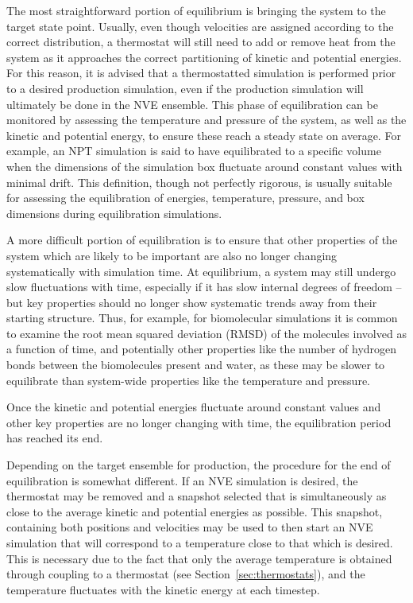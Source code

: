 \documentclass[9pt,bestpractices]{livecoms}
\begin{document}
The most straightforward portion of equilibrium is bringing the system to the target state point.
Usually, even though velocities are assigned according to the correct distribution, a thermostat will still need to add or remove heat from the system as it approaches the correct partitioning of kinetic and potential energies.
For this reason, it is advised that a thermostatted simulation is performed prior to a desired production simulation, even if the production simulation will ultimately be done in the NVE ensemble. 
This phase of equilibration can be monitored by assessing the temperature and pressure of the system, as well as the kinetic and potential energy, to ensure these reach a steady state on average.
For example, an NPT simulation is said to have equilibrated to a specific volume when the dimensions of the simulation box fluctuate around constant values with minimal drift. 
This definition, though not perfectly rigorous, is usually suitable for assessing the equilibration of energies, temperature, pressure, and box dimensions during equilibration simulations.

A more difficult portion of equilibration is to ensure that other properties of the system which are likely to be important are also no longer changing systematically with simulation time.
At equilibrium, a system may still undergo slow fluctuations with time, especially if it has slow internal degrees of freedom -- but key properties should no longer show systematic trends away from their starting structure.
Thus, for example, for biomolecular simulations it is common to examine the root mean squared deviation (RMSD) of the molecules involved as a function of time, and potentially other properties like the number of hydrogen bonds between the biomolecules present and water, as these may be slower to equilibrate than system-wide properties like the temperature and pressure.

Once the kinetic and potential energies fluctuate around constant values and other key properties are no longer changing with time, the equilibration period has reached its end.

Depending on the target ensemble for production, the procedure for the end of equilibration is somewhat different.
If an NVE simulation is desired, the thermostat may be removed and a snapshot selected that is simultaneously as close to the average kinetic and potential energies as possible.
This snapshot, containing both positions and velocities may be used to then start an NVE simulation that will correspond to a temperature close to that which is desired.
This is necessary due to the fact that only the average temperature is obtained through coupling to a thermostat (see Section~\ref{sec:thermostats}), and the temperature fluctuates with the kinetic energy at each timestep.
\end{document}
